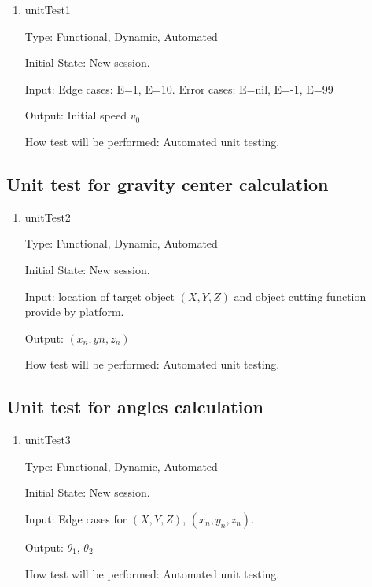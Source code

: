 \documentclass[12pt, titlepage]{article}
\begin{document}
\begin{enumerate}
	
	\item{unitTest1\\}
	
	Type: Functional, Dynamic, Automated
	
	Initial State: New session.
	
	Input: Edge cases: E=1, E=10.
			Error cases: E=nil, E=-1, E=99
	
	Output: Initial speed $v_{0}$
	
	How test will be performed: Automated unit testing.
	
\end{enumerate}

\subsection{Unit test for gravity center calculation}

\begin{enumerate}
	
	\item{unitTest2\\}
	
	Type: Functional, Dynamic, Automated
	
	Initial State: New session.
	
	Input: location of target object $(X,Y,Z)$ and object cutting function provide by platform. 
	
	Output: $(x_{n},y{n},z_{n})$
	
	How test will be performed: Automated unit testing.
	
\end{enumerate}

\subsection{Unit test for angles calculation}

\begin{enumerate}
	
	\item{unitTest3\\}
	
	Type: Functional, Dynamic, Automated
	
	Initial State: New session.
	
	Input: Edge cases for $(X,Y,Z)$, $(x_{n},y_{n},z_{n})$.
	
	Output: $\theta_{1}$, $\theta_{2}$
	
	How test will be performed: Automated unit testing.
	
\end{enumerate}
\end{document}
